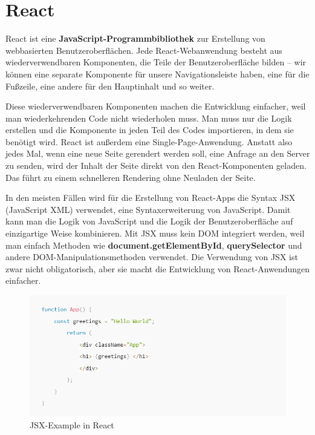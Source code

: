 
\section{React}
React ist eine \textbf{JavaScript-Programmbibliothek} zur Erstellung von webbasierten Benutzeroberflächen. 
Jede React-Webanwendung besteht aus wiederverwendbaren Komponenten, die Teile der Benutzeroberfläche bilden – wir können 
eine separate Komponente für unsere Navigationsleiste haben, eine für die Fußzeile, eine andere für den Hauptinhalt und so weiter. 

Diese wiederverwendbaren Komponenten machen die Entwicklung einfacher, weil man wiederkehrenden Code nicht wiederholen muss. 
Man muss nur die Logik erstellen und die Komponente in jeden Teil des Codes importieren, in dem sie benötigt wird.
React ist außerdem eine Single-Page-Anwendung. Anstatt also jedes Mal, wenn eine neue Seite gerendert werden soll, eine Anfrage 
an den Server zu senden, wird der Inhalt der Seite direkt von den React-Komponenten geladen. Das führt zu einem schnelleren 
Rendering ohne Neuladen der Seite.

In den meisten Fällen wird für die Erstellung von React-Apps die Syntax JSX (JavaScript XML) verwendet, eine Syntaxerweiterung 
von JavaScript. Damit kann man die Logik von JavaScript und die Logik der Benutzeroberfläche auf einzigartige Weise kombinieren. 
Mit JSX muss kein DOM integriert werden, weil man einfach Methoden wie \textbf{document.getElementById}, \textbf{querySelector} 
und andere DOM-Manipulationsmethoden verwendet.
Die Verwendung von JSX ist zwar nicht obligatorisch, aber sie macht die Entwicklung von React-Anwendungen einfacher.


\begin{figure}[ht!]
    \includegraphics[width=.94\textwidth]{pics/jsx-example.PNG}
    \caption{\label{fig:The-caption}JSX-Example in React \cite{APCW2006}}
  \end{figure}

